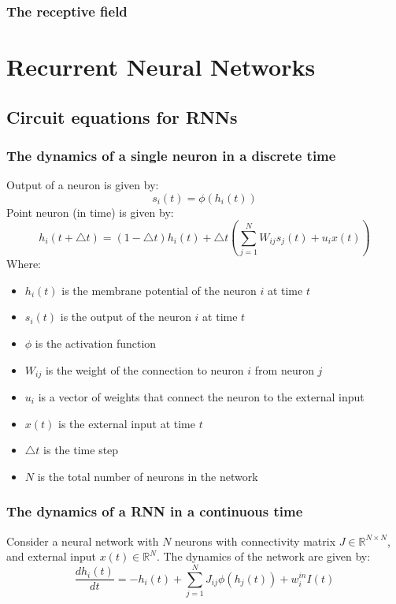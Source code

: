 \documentclass[11pt]{book} %
\begin{document}
\subsection{The receptive field}


%
%
%
%
%
%
%
%
%
%
%
%
%
%
%
%


\chapter{Recurrent Neural Networks}

\section{Circuit equations for RNNs}


\subsection{The dynamics of a single neuron in a discrete time}
Output of a neuron is given by:
\[
    s_i(t) = \phi(h_i(t))
\]
Point neuron (in time) is given by:
\[
    h_i(t + \bigtriangleup  t) = (1 - \bigtriangleup t) h_i(t) + \bigtriangleup t (\sum_{j=1}^N W_{ij} s_j(t) + u_ix(t))
\]
Where:
\begin{itemize}
    \item $h_i(t)$ is the membrane potential of the neuron $i$ at time $t$
    \item $s_i(t)$ is the output of the neuron $i$ at time $t$
    \item $\phi$ is the activation function
    \item $W_{ij}$ is the weight of the connection to neuron $i$ from neuron $j$
    \item $u_i$ is a vector of weights that connect the neuron to the external input
    \item $x(t)$ is the external input at time $t$
    \item $\bigtriangleup t$ is the time step
    \item $N$ is the total number of neurons in the network
\end{itemize}

\subsection{The dynamics of a RNN in a continuous time}
Consider a neural network with $N$ neurons with connectivity matrix $J \in \mathbb{R}^{N \times N}$, and external input $x(t) \in \mathbb{R}^N$.
The dynamics of the network are given by:
\[
    \frac{dh_i(t)}{dt} = -h_i(t) + \sum_{j=1}^N J_{ij} \phi(h_j(t)) + w_i^{in} I(t)
\]
\end{document}
